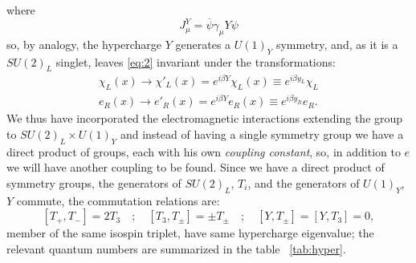 where
\begin{equation}
  \label{eq:8}
  J_{\mu}^{Y} = \overbar{\psi} \gamma_{\mu} Y \psi
\end{equation}
so, by analogy, the hypercharge $Y$ generates a $U(1)_{Y}$ symmetry, and, as it
is a $SU(2)_{L}$ singlet, leaves \eqref{eq:2} invariant under the
transformations:
\begin{equation}
  \label{eq:9}
  \begin{split}
    \chi_{L}(x) \rightarrow \chi'_{L}(x) = e^{i \beta Y} \chi_{L}(x)
    \equiv e^{i \beta y_{L}} \chi_{L} \\
    e_{R}(x) \rightarrow e'_{R}(x) = e^{i \beta Y}e_{R}(x) \equiv e^{i \beta
      y_{R}}e_{R}.
  \end{split}
\end{equation}
We thus have incorporated the electromagnetic interactions extending the group
to $SU(2)_{L} \times U(1)_{Y}$ and instead of having a single symmetry group we
have a direct product of groups, each with his own \emph{coupling constant}, so,
in addition to $e$ we will have another coupling to be found.  Since we have a
direct product of symmetry groups, the generators of $SU(2)_{L}$, $T_{i}$, and
the generators of $U(1)_{Y}$, $Y$ commute, the commutation relations are:
\begin{equation}
  \label{eq:10}
  [T_{+},T_{-}] = 2 T_{3} \quad ; \quad [T_{3},T_{\pm}] = \pm T_{\pm}
  \quad ; \quad [Y,T_{\pm}] = [Y,T_{3}] = 0,
\end{equation}
member of the same isospin triplet, have same hypercharge eigenvalue; the
relevant quantum numbers are summarized in the table ~\ref{tab:hyper}.
